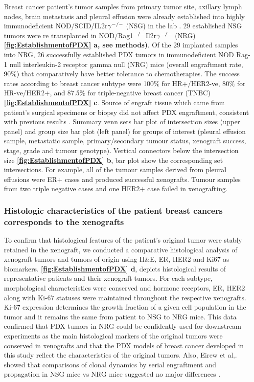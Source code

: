 Breast cancer patient's tumor samples from primary tumor site, axillary lymph nodes, brain metastasis and pleural effusion were already established into highly immunodeficient NOD/SCID/IL2r$\gamma^{\small{-/-}}$ (NSG) in the lab \cite{eirew2015dynamics}. 
29 established NSG tumors were re transplanted in NOD/Rag1$^{\small{-/-}}$Il2r$\gamma ^{\small{-/-}}$ (NRG) \cite{pearson2008non} \textbf{\autoref{fig:EstablishmentofPDX} a, see methods)}.
Of the 29 implanted samples into NRG, 26 successfully established PDX tumors in immunodeficient NOD Rag-1 null interleukin-2 receptor gamma null (NRG) mice (overall engraftment rate, 90\%) that comparatively have better tolerance to chemotherapies. 
The success rates according to breast cancer subtype were 100\% for HR+/HER2-ve, 80\% for HR-ve/HER2+, and 87.5\% for triple-negative breast cancer (TNBC) \textbf{\autoref{fig:EstablishmentofPDX} c}. Source of engraft tissue which came from patient's surgical specimens or biopsy did not affect PDX engraftment, consistent with previous results \cite{ryu2019integrative}. Summary venn sets bar plot of intersection sizes (upper panel) and group size bar plot (left panel) for groups of interest (pleural effusion sample, metastatic sample, primary/secondary tumour status, xenograft success, stage, grade and tumour genotype). Vertical connectors below the intersection size \textbf{\autoref{fig:EstablishmentofPDX} b},
bar plot show the corresponding set intersections. For example, all of the tumour samples derived from pleural effusions were ER+ cases and produced successful xenografts. Tumour samples from two triple negative cases and one HER2+ case failed in xenografting.


\subsubsection{Histologic characteristics of the patient breast cancers corresponds to the xenografts}

To confirm that histological features of the patient's original tumor were stably retained in the xenograft, we conducted a comparative histological analysis of xenograft tumors and tumors of origin using H\&E, ER, HER2 and Ki67 as biomarkers. 
\textbf{\autoref{fig:EstablishmentofPDX} d}, depicts histological results of representative patients and their xenograft tumors. For each subtype, morphological characteristics were conserved and hormone receptors, ER, HER2 along with Ki-67 statuses were maintained throughout the respective xenografts. Ki-67 expression determines the growth fraction of a given cell population in the tumor and it remains the same from patient to NSG to NRG mice. This data confirmed that PDX tumors in \ac{NRG} could be confidently used for downstream experiments as the main histological markers of the original tumors were conserved in xenografts and that the PDX models of breast cancer developed in this study reflect the characteristics of the original tumors. Also, Eirew et al,. showed that comparisons of clonal dynamics by serial engraftment and propagation in NSG mice vs NRG mice suggested no major differences \cite{eirew2015dynamics}.


